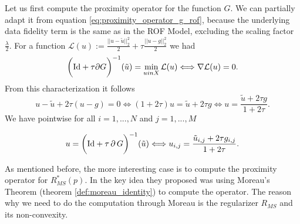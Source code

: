         Let us first compute the proximity operator for the function $G$. We can partially adapt it from equation \ref{eq:proximity_operator_g_rof}, because the underlying data fidelity term is the same as in the ROF Model, excluding the scaling factor $\frac{\lambda}{2}$. For a function $\mathcal{L}(u) := \frac{||u - \tilde{u}||_{2}^{2}}{2} + \tau \frac{||u - g||_{2}^{2}}{2}$ we had
            $$
                \bigg( \textnormal{Id} + \tau \partial G \bigg)^{-1}(\tilde{u}) = \min_{u in X} \mathcal{L}(u) \Longleftrightarrow \nabla \mathcal{L}(u) = 0.
            $$
        From this characterization it follows
            $$
                u - \tilde{u} + 2\tau (u - g) = 0 \Longleftrightarrow (1 + 2\tau)u = \tilde{u} + 2\tau g \Longleftrightarrow u = \frac{\tilde{u} + 2\tau g}{1 + 2\tau}.
            $$
        We have pointwise for all $i = 1, ..., N$ and $j = 1, ..., M$

            \begin{equation}
                u = \bigg( \textnormal{Id} + \tau\,\partial\,G \bigg)^{-1}(\tilde{u}) \Longleftrightarrow u_{i,j} = \frac{\tilde{u}_{i,j} + 2\tau g_{i,j}}{1 + 2\tau}.
            \label{eq:proximity_operator_G}
            \end{equation}

        As mentioned before, the more interesting case is to compute the proximity operator for $R_{MS}^{\ast}(p)$. In \cite{Strekalovskiy-Cremers-eccv14} the key idea they proposed was using Moreau's Theorem (theorem \ref{def:moreau_identity}) to compute the operator. The reason why we need to do the computation through Moreau is the regularizer $R_{MS}$ and its non-convexity. 


